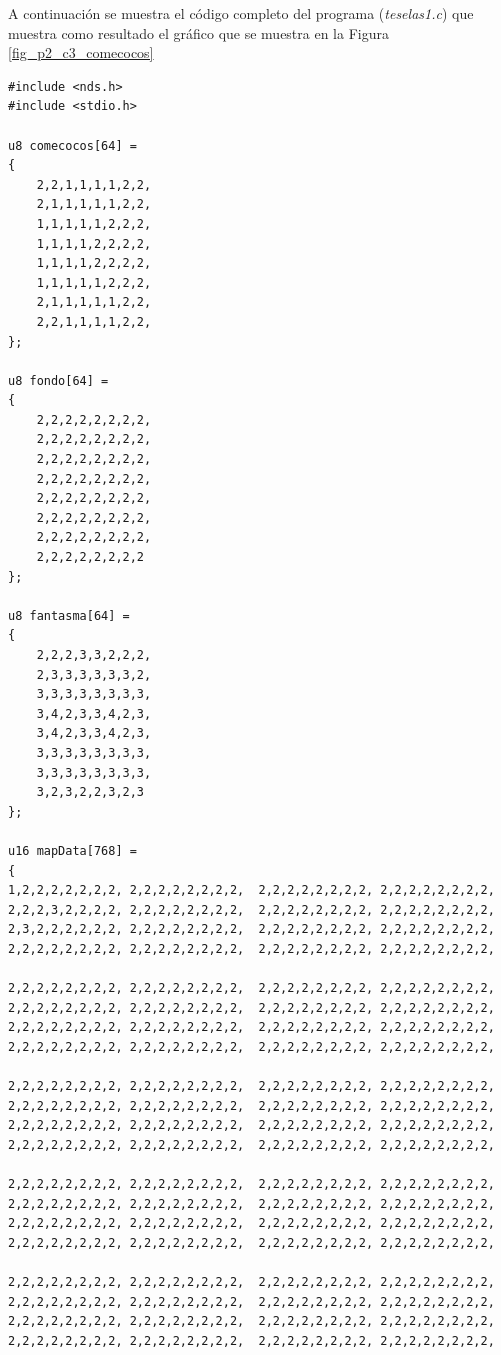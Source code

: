 \begin{example}
A continuación se muestra el código completo del programa (\textit{teselas1.c}) que muestra como resultado el gráfico que se muestra en la Figura \ref{fig_p2_c3_comecocos}

\begin{lstlisting}
#include <nds.h>
#include <stdio.h>

u8 comecocos[64] =
{
	2,2,1,1,1,1,2,2,
	2,1,1,1,1,1,2,2,
	1,1,1,1,1,2,2,2,
	1,1,1,1,2,2,2,2,
	1,1,1,1,2,2,2,2,
	1,1,1,1,1,2,2,2,
	2,1,1,1,1,1,2,2,
	2,2,1,1,1,1,2,2,
};

u8 fondo[64] =
{
	2,2,2,2,2,2,2,2,
	2,2,2,2,2,2,2,2,
	2,2,2,2,2,2,2,2,
	2,2,2,2,2,2,2,2,
	2,2,2,2,2,2,2,2,
	2,2,2,2,2,2,2,2,
	2,2,2,2,2,2,2,2,
	2,2,2,2,2,2,2,2
};

u8 fantasma[64] =
{
	2,2,2,3,3,2,2,2,
	2,3,3,3,3,3,3,2,
	3,3,3,3,3,3,3,3,
	3,4,2,3,3,4,2,3,
	3,4,2,3,3,4,2,3,
	3,3,3,3,3,3,3,3,
	3,3,3,3,3,3,3,3,
	3,2,3,2,2,3,2,3
};

u16 mapData[768] =
{
1,2,2,2,2,2,2,2, 2,2,2,2,2,2,2,2,  2,2,2,2,2,2,2,2, 2,2,2,2,2,2,2,2,
2,2,2,3,2,2,2,2, 2,2,2,2,2,2,2,2,  2,2,2,2,2,2,2,2, 2,2,2,2,2,2,2,2,
2,3,2,2,2,2,2,2, 2,2,2,2,2,2,2,2,  2,2,2,2,2,2,2,2, 2,2,2,2,2,2,2,2,
2,2,2,2,2,2,2,2, 2,2,2,2,2,2,2,2,  2,2,2,2,2,2,2,2, 2,2,2,2,2,2,2,2,

2,2,2,2,2,2,2,2, 2,2,2,2,2,2,2,2,  2,2,2,2,2,2,2,2, 2,2,2,2,2,2,2,2,
2,2,2,2,2,2,2,2, 2,2,2,2,2,2,2,2,  2,2,2,2,2,2,2,2, 2,2,2,2,2,2,2,2,
2,2,2,2,2,2,2,2, 2,2,2,2,2,2,2,2,  2,2,2,2,2,2,2,2, 2,2,2,2,2,2,2,2,
2,2,2,2,2,2,2,2, 2,2,2,2,2,2,2,2,  2,2,2,2,2,2,2,2, 2,2,2,2,2,2,2,2,

2,2,2,2,2,2,2,2, 2,2,2,2,2,2,2,2,  2,2,2,2,2,2,2,2, 2,2,2,2,2,2,2,2,
2,2,2,2,2,2,2,2, 2,2,2,2,2,2,2,2,  2,2,2,2,2,2,2,2, 2,2,2,2,2,2,2,2,
2,2,2,2,2,2,2,2, 2,2,2,2,2,2,2,2,  2,2,2,2,2,2,2,2, 2,2,2,2,2,2,2,2,
2,2,2,2,2,2,2,2, 2,2,2,2,2,2,2,2,  2,2,2,2,2,2,2,2, 2,2,2,2,2,2,2,2,

2,2,2,2,2,2,2,2, 2,2,2,2,2,2,2,2,  2,2,2,2,2,2,2,2, 2,2,2,2,2,2,2,2,
2,2,2,2,2,2,2,2, 2,2,2,2,2,2,2,2,  2,2,2,2,2,2,2,2, 2,2,2,2,2,2,2,2,
2,2,2,2,2,2,2,2, 2,2,2,2,2,2,2,2,  2,2,2,2,2,2,2,2, 2,2,2,2,2,2,2,2,
2,2,2,2,2,2,2,2, 2,2,2,2,2,2,2,2,  2,2,2,2,2,2,2,2, 2,2,2,2,2,2,2,2,

2,2,2,2,2,2,2,2, 2,2,2,2,2,2,2,2,  2,2,2,2,2,2,2,2, 2,2,2,2,2,2,2,2,
2,2,2,2,2,2,2,2, 2,2,2,2,2,2,2,2,  2,2,2,2,2,2,2,2, 2,2,2,2,2,2,2,2,
2,2,2,2,2,2,2,2, 2,2,2,2,2,2,2,2,  2,2,2,2,2,2,2,2, 2,2,2,2,2,2,2,2,
2,2,2,2,2,2,2,2, 2,2,2,2,2,2,2,2,  2,2,2,2,2,2,2,2, 2,2,2,2,2,2,2,2,


\end{lstlisting}
\end{example}
